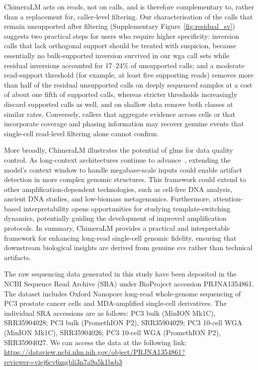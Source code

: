 \documentclass[pdflatex,lineno]{sn-jnl}%
\newif\ifrevisedtext
\newcommand{\chg}[1]{\ifrevisedtext\textcolor{revcolor}{#1}\else#1\fi}
\begin{document}
\chg{ChimeraLM acts on reads, not on calls, and is therefore complementary to, rather than a replacement for, caller-level filtering.
	Our characterisation of the calls that remain unsupported after filtering (Supplementary Figure~\ref{fig:residual_sv}) suggests two practical steps for users who require higher specificity: inversion calls that lack orthogonal support should be treated with suspicion, because essentially no bulk-supported inversion survived in our \gls{wga} call sets while residual inversions accounted for 17--24\% of unsupported calls; and a moderate read-support threshold (for example, at least five supporting reads) removes more than half of the residual unsupported calls on deeply sequenced samples at a cost of about one fifth of supported calls, whereas stricter thresholds increasingly discard supported calls as well, and on shallow data remove both classes at similar rates.
	Conversely, callers that aggregate evidence across cells or that incorporate coverage and phasing information may recover genuine events that single-cell read-level filtering alone cannot confirm.}

More broadly, ChimeraLM illustrates the potential of \glspl{glm} for data quality control.
As long-context architectures continue to advance~\cite{nguyen2023hyenadna}, extending the model's context window to handle megabase-scale inputs could enable artifact detection in more complex genomic structures.
This framework could extend to other amplification-dependent technologies, such as cell-free DNA analysis, ancient DNA studies, and low-biomass metagenomics.
Furthermore, attention-based interpretability opens opportunities for studying template-switching dynamics, potentially guiding the development of improved amplification protocols.
In summary, ChimeraLM provides a practical and interpretable framework for enhancing long-read single-cell genomic fidelity, ensuring that downstream biological insights are derived from genuine \glspl{sv} rather than technical artifacts.

\backmatter


The raw sequencing data generated in this study have been deposited in the NCBI Sequence Read Archive (SRA) under BioProject accession PRJNA1354861.
The dataset includes Oxford Nanopore long-read whole-genome sequencing of PC3 prostate cancer cells and MDA-amplified single-cell derivatives.
The individual SRA accessions are as follows:
PC3 bulk (MinION Mk1C), SRR35904028; PC3 bulk (PromethION P2), SRR35904029;
PC3 10-cell WGA (MinION Mk1C), SRR35904026; PC3 10-cell WGA (PromethION P2), SRR35904027.
We can access the data at the following link: \url{https://dataview.ncbi.nlm.nih.gov/object/PRJNA1354861?reviewer=viej6cv6mgbli3n7a9a5k1bsb3}
\end{document}
